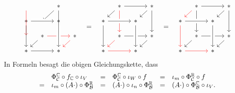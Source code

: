 \documentclass[a4paper,10pt,numbers=noenddot]{scrartcl}
\begin{document}
\[\begin{array}{cccccccc}
\begin{tikzcd}[row sep = 10, column sep = 10]
        \arrow[dd, red]
      & {}
      & *
        \arrow[ld]
        \arrow[dd]
      \\
        *
        \arrow[rr, crossing over]
        \arrow[dd]
      & {}
      & *
        \arrow[dd]
      & {}
      \\
        {}
      & *
        \arrow[rr, red]
        \arrow[ld]
      & {}
      & *
        \arrow[ld, red]
      \\
        *
        \arrow[rr]
      & {}
      & *
        \arrow[from=uu, crossing over]
      & {}
    \end{tikzcd}
    & = &
    \begin{tikzcd}[row sep = 10, column sep = 10]
        {}
      & *
        \arrow[rr]
        \arrow[ld]
        \arrow[dd, red]
      & {}
      & *
        \arrow[ld]
        \arrow[dd]
      \\
        *
        \arrow[rr, crossing over]
        \arrow[dd]
      & {}
      & *
        \arrow[dd]
      & {}
      \\
        {}
      & *
        \arrow[rr]
        \arrow[ld,red]
      & {}
      & *
        \arrow[ld]
      \\
        *
        \arrow[rr,red]
      & {}
      & *
        \arrow[from=uu, crossing over]
      & {}
    \end{tikzcd}
    & = &
    \begin{tikzcd}[row sep = 10, column sep = 10]
        {}
      & *
        \arrow[rr]
        \arrow[ld, red]
        \arrow[dd]
      & {}
      & *
        \arrow[ld]
        \arrow[dd]
      \\
        *
        \arrow[rr, crossing over]
        \arrow[dd, red]
      & {}
      & *
        \arrow[dd]
      & {}
      \\
        {}
      & *
        \arrow[rr]
        \arrow[ld]
      & {}
      & *
        \arrow[ld]
      \\
        *
        \arrow[rr,red]
      & {}
      & *
        \arrow[from=uu, crossing over]
      & {}
    \end{tikzcd}
  \end{array}
\]
In Formeln besagt die obigen Gleichungskette, dass
\[
\begin{array}{clclcl}
    & \Phi^{\mathbb{C}}_{\mathcal{C}} \circ f_{\mathbb{C}} \circ \iota_V
  &=&  \Phi^{\mathbb{C}}_{\mathcal{C}} \circ \iota_W \circ f
  &=&  \iota_m \circ \Phi^{\mathbb{R}}_{\mathcal{C}} \circ f \\
   =&  \iota_m \circ (A \cdot) \circ \Phi^{\mathbb{R}}_{\mathcal{B}}
  &=&  (A \cdot) \circ \iota_n \circ \Phi^{\mathbb{R}}_{\mathcal{B}}
  &=&  (A \cdot) \circ \Phi^{\mathbb{C}}_{\mathcal{B}} \circ \iota_V.
\end{array}
\]
\end{document}
